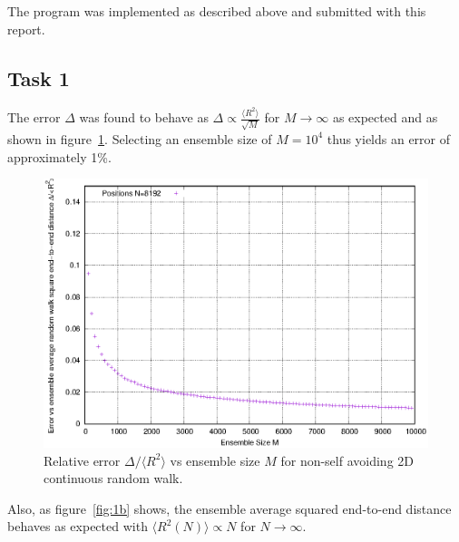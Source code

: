 \documentclass[11pt,a4paper]{article}
\begin{document}
The program was implemented as described above and submitted with this report. 

\subsection{Task 1}

The error $\Delta$ was found to behave as $\Delta \propto \frac{\langle R^2 \rangle}{\sqrt{M}}$ for $M \rightarrow \infty$ as
expected and as shown in figure~\ref{fig:1a}. Selecting an ensemble size of $M=10^4$ thus yields
an error of approximately 1\%.

\begin{figure}[ht]
\begin{center}
\includegraphics[scale=1.2]{figure1a.eps} 
\end{center}
\caption{Relative error $\Delta / \langle R^2 \rangle$ vs ensemble size $M$ for non-self avoiding 2D continuous random walk.}
\label{fig:1a}
\end{figure}

Also, as figure~\ref{fig:1b} shows, the ensemble average squared end-to-end distance behaves as expected with
$\langle R^2(N) \rangle \propto N$ for $N \rightarrow \infty$.
\end{document}
